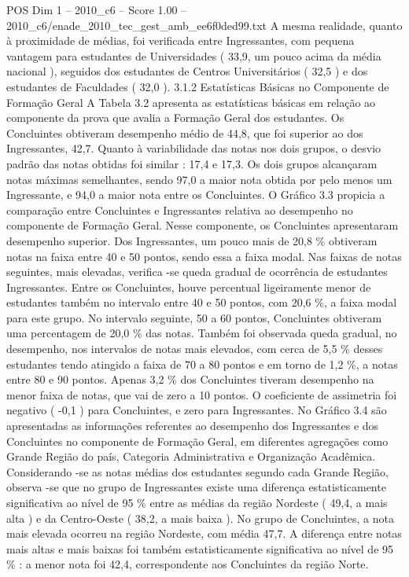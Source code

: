 \begin{textsample}{POS Dim 1 – 2010\_c6 – Score 1.00 – 2010\_c6/enade\_2010\_tec\_gest\_amb\_ee6f0ded99.txt}
A mesma realidade, quanto à proximidade de médias, foi verificada entre Ingressantes, com pequena vantagem para estudantes de Universidades ( 33,9, um pouco acima da média nacional ), seguidos dos estudantes de Centros Universitários ( 32,5 ) e dos estudantes de Faculdades ( 32,0 ). 3.1.2 Estatísticas Básicas no Componente de Formação Geral A Tabela 3.2 apresenta as estatísticas básicas em relação ao componente da prova que avalia a Formação Geral dos estudantes.
Os Concluintes obtiveram desempenho médio de 44,8, que foi superior ao dos Ingressantes, 42,7.
Quanto à variabilidade das notas nos dois grupos, o desvio padrão das notas obtidas foi similar : 17,4 e 17,3.
Os dois grupos alcançaram notas máximas semelhantes, sendo 97,0 a maior nota obtida por pelo menos um Ingressante, e 94,0 a maior nota entre os Concluintes.
O Gráfico 3.3 propicia a comparação entre Concluintes e Ingressantes relativa ao desempenho no componente de Formação Geral.
Nesse componente, os Concluintes apresentaram desempenho superior.
Dos Ingressantes, um pouco mais de 20,8 \% obtiveram notas na faixa entre 40 e 50 pontos, sendo essa a faixa modal.
Nas faixas de notas seguintes, mais elevadas, verifica -se queda gradual de ocorrência de estudantes Ingressantes.
Entre os Concluintes, houve percentual ligeiramente menor de estudantes também no intervalo entre 40 e 50 pontos, com 20,6 \%, a faixa modal para este grupo.
No intervalo seguinte, 50 a 60 pontos, Concluintes obtiveram uma percentagem de 20,0 \% das notas.
Também foi observada queda gradual, no desempenho, nos intervalos de notas mais elevados, com cerca de 5,5 \% desses estudantes tendo atingido a faixa de 70 a 80 pontos e em torno de 1,2 \%, a notas entre 80 e 90 pontos.
Apenas 3,2 \% dos Concluintes tiveram desempenho na menor faixa de notas, que vai de zero a 10 pontos.
O coeficiente de assimetria foi negativo ( -0,1 ) para Concluintes, e zero para Ingressantes.
No Gráfico 3.4 são apresentadas as informações referentes ao desempenho dos Ingressantes e dos Concluintes no componente de Formação Geral, em diferentes agregações como Grande Região do país, Categoria Administrativa e Organização Acadêmica.
Considerando -se as notas médias dos estudantes segundo cada Grande Região, observa -se que no grupo de Ingressantes existe uma diferença estatisticamente significativa ao nível de 95 \% entre as médias da região Nordeste ( 49,4, a mais alta ) e da Centro-Oeste ( 38,2, a mais baixa ).
No grupo de Concluintes, a nota mais elevada ocorreu na região Nordeste, com média 47,7.
A diferença entre notas mais altas e mais baixas foi também estatisticamente significativa ao nível de 95 \% : a menor nota foi 42,4, correspondente aos Concluintes da região Norte.

\end{textsample}
